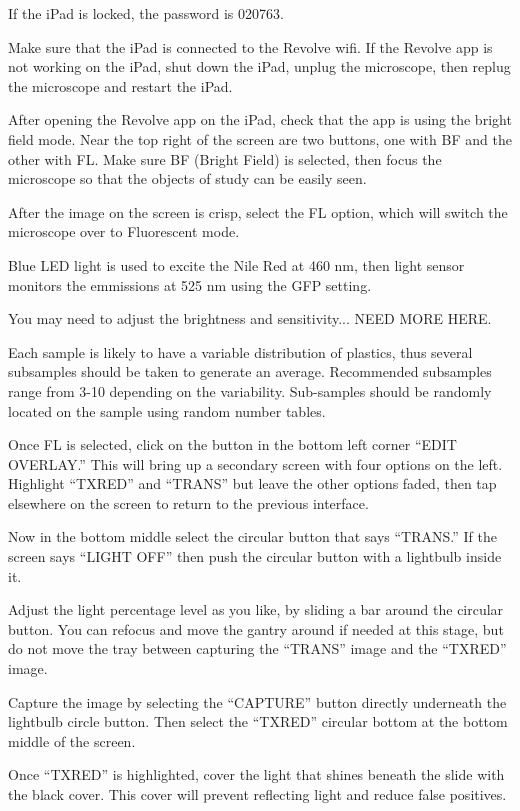 \documentclass[12pt]{../SOP4_alpha}\usepackage[]{graphicx}\usepackage[]{color}
\begin{document}
\NP If the iPad is locked, the password is 020763.

\NP Make sure that the iPad is connected to the Revolve wifi. If the Revolve app is not working on the iPad, shut down the iPad, unplug the microscope, then replug the microscope and restart the iPad. 

\NP After opening the Revolve app on the iPad, check that the app is using the bright field mode. Near the top right of the screen are two buttons, one with BF and the other with FL. Make sure BF (Bright Field) is selected, then focus the microscope so that the objects of study can be easily seen. 

\NP After the image on the screen is crisp, select the FL option, which will switch the microscope over to Fluorescent mode. 

\NP Blue LED light is used to excite the Nile Red at 460 nm, then light sensor monitors the emmissions at 525 nm using the GFP setting.

\NP You may need to adjust the brightness and sensitivity... NEED MORE HERE.

\NP Each sample is likely to have a variable distribution of plastics, thus several subsamples should be taken to generate an average. Recommended subsamples range from 3-10 depending on the variability. Sub-samples should be randomly located on the sample using random number tables. 

\NP Once FL is selected, click on the button in the bottom left corner ``EDIT OVERLAY.'' This will bring up a secondary screen with four options on the left. Highlight ``TXRED'' and “TRANS” but leave the other options faded, then tap elsewhere on the screen to return to the previous interface.

\NP Now in the bottom middle select the circular button that says ``TRANS.'' If the screen says ``LIGHT OFF'' then push the circular button with a lightbulb inside it. 

\NP Adjust the light percentage level as you like, by sliding a bar around the circular button. You can refocus and move the gantry around if needed at this stage, but do not move the tray between capturing the ``TRANS'' image and the ``TXRED'' image. 

\NP Capture the image by selecting the ``CAPTURE'' button directly underneath the lightbulb circle button. Then select the ``TXRED'' circular bottom at the bottom middle of the screen.

\NP Once ``TXRED'' is highlighted, cover the light that shines beneath the slide with the black cover. This cover will prevent reflecting light and reduce false positives. 
\end{document}
